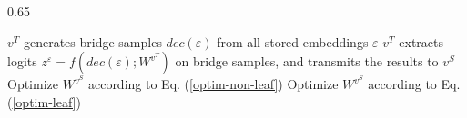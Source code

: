 \documentclass[10pt,journal]{IEEEtran}
\begin{document}
\begin{algorithm}[t]
	\caption{Bridge Sample Based Online Distillation Protocol (BSBODP)}
	\SetAlgoNoLine
    

	\label{alg1}
	\begin{spacing}{0.65}
        
        \begin{algorithmic}[0]
            
           \State {}
          \State {}
          \State {}
		\EndProcedure


            \State 
                $v^{T}$ generates bridge samples $dec(\varepsilon)$ from all stored embeddings $\varepsilon$
            \State $v^{T}$ extracts logits ${z^\varepsilon} = f(dec(\varepsilon );{W^{{v^T}}})$ on bridge samples, and transmits the results to $v^{S}$
            \State {}
            {
            \State Optimize $W^{v^{S}}$ according to Eq. (\ref{optim-non-leaf})
            }
            \State \Else
            {
            \State Optimize $W^{v^{S}}$ according to Eq. (\ref{optim-leaf})
            }
            \EndProcedure 
           \end{algorithmic}
	\end{spacing}
\end{algorithm}
\end{document}
